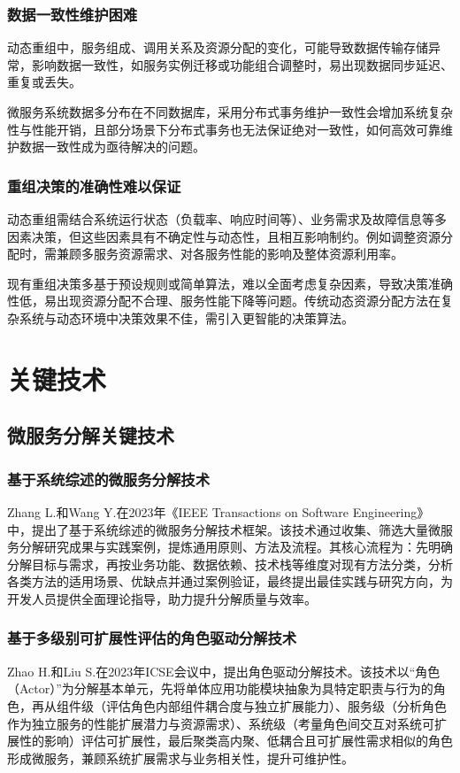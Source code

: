 \documentclass[lang=cn,11pt,a4paper,cite=number]{elegantpaper}
\begin{document}
\subsubsection{数据一致性维护困难}
\label{sec:x1}
动态重组中，服务组成、调用关系及资源分配的变化，可能导致数据传输存储异常，影响数据一致性，如服务实例迁移或功能组合调整时，易出现数据同步延迟、重复或丢失。\par
微服务系统数据多分布在不同数据库，采用分布式事务维护一致性会增加系统复杂性与性能开销，且部分场景下分布式事务也无法保证绝对一致性，如何高效可靠维护数据一致性成为亟待解决的问题。
\subsubsection{重组决策的准确性难以保证}
\label{sec:x1}
动态重组需结合系统运行状态（负载率、响应时间等）、业务需求及故障信息等多因素决策，但这些因素具有不确定性与动态性，且相互影响制约。例如调整资源分配时，需兼顾多服务资源需求、对各服务性能的影响及整体资源利用率。\par
现有重组决策多基于预设规则或简单算法，难以全面考虑复杂因素，导致决策准确性低，易出现资源分配不合理、服务性能下降等问题。传统动态资源分配方法在复杂系统与动态环境中决策效果不佳，需引入更智能的决策算法。\cite{tcc2023reclaimer}

\section{关键技术}
\subsection{微服务分解关键技术}
\subsubsection{基于系统综述的微服务分解技术}
\label{sec:x1}
Zhang L.和Wang Y.在2023年《IEEE Transactions on Software Engineering》中，提出了基于系统综述的微服务分解技术框架。该技术通过收集、筛选大量微服务分解研究成果与实践案例，提炼通用原则、方法及流程。其核心流程为：先明确分解目标与需求，再按业务功能、数据依赖、技术栈等维度对现有方法分类，分析各类方法的适用场景、优缺点并通过案例验证，最终提出最佳实践与研究方向，为开发人员提供全面理论指导，助力提升分解质量与效率。\cite{tsse2023decomposition}
\subsubsection{基于多级别可扩展性评估的角色驱动分解技术}
\label{sec:x1}
Zhao H.和Liu S.在2023年ICSE会议中，提出角色驱动分解技术。该技术以“角色（Actor）”为分解基本单元，先将单体应用功能模块抽象为具特定职责与行为的角色，再从组件级（评估角色内部组件耦合度与独立扩展能力）、服务级（分析角色作为独立服务的性能扩展潜力与资源需求）、系统级（考量角色间交互对系统可扩展性的影响）评估可扩展性，最后聚类高内聚、低耦合且可扩展性需求相似的角色形成微服务，兼顾系统扩展需求与业务相关性，提升可维护性。
\cite{icse2023actor}
\end{document}

